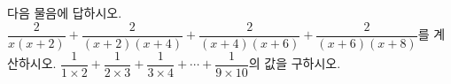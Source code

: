 다음 물음에 답하시오.
 $\dfrac{2}{x(x+2)}+\dfrac{2}{(x+2)(x+4)}+\dfrac{2}{(x+4)(x+6)}+\dfrac{2}{(x+6)(x+8)}$를 계산하시오.
 $\dfrac{1}{1\times 2}+\dfrac{1}{2\times 3}+\dfrac{1}{3\times 4}+\cdots+\dfrac{1}{9\times 10}$의 값을 구하시오.
